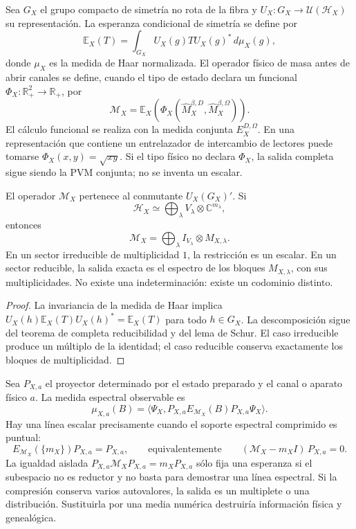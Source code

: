 Sea \(G_X\) el grupo compacto de simetría no rota de la fibra y
\(U_X:G_X\to\mathcal U(\mathcal H_X)\) su representación. La esperanza
condicional de simetría se define por
\[
 \mathbb E_X(T)
 =\int_{G_X}U_X(g)TU_X(g)^*\,d\mu_X(g),
\]
donde \(\mu_X\) es la medida de Haar normalizada. El operador físico de masa
antes de abrir canales se define, cuando el tipo de estado declara un
funcional \(\Phi_X:\mathbb R_+^2\to\mathbb R_+\), por
\[
 \mathcal M_X
 =\mathbb E_X\!\left(
   \Phi_X(\widehat M_X^{\beta,D},\widehat M_X^{\beta,\Omega})
  \right).
\]
El cálculo funcional se realiza con la medida conjunta
\(E_X^{D,\Omega}\). En una representación que contiene un entrelazador de
intercambio de lectores puede tomarse \(\Phi_X(x,y)=\sqrt{xy}\). Si el tipo
físico no declara \(\Phi_X\), la salida completa sigue siendo la PVM conjunta;
no se inventa un escalar.

\begin{theorem}
El operador \(\mathcal M_X\) pertenece al conmutante
\(U_X(G_X)'\). Si
\[
 \mathcal H_X\simeq
 \bigoplus_\lambda V_\lambda\otimes\mathbb C^{m_\lambda},
\]
entonces
\[
 \mathcal M_X=
 \bigoplus_\lambda I_{V_\lambda}\otimes M_{X,\lambda}.
\]
En un sector irreducible de multiplicidad \(1\), la restricción es un escalar.
En un sector reducible, la salida exacta es el espectro de los bloques
\(M_{X,\lambda}\), con sus multiplicidades. No existe una indeterminación:
existe un codominio distinto.
\end{theorem}

\begin{proof}
La invariancia de la medida de Haar implica
\(U_X(h)\mathbb E_X(T)U_X(h)^*=\mathbb E_X(T)\) para todo \(h\in G_X\).
La descomposición sigue del teorema de completa reducibilidad y del lema de
Schur. El caso irreducible produce un múltiplo de la identidad; el caso
reducible conserva exactamente los bloques de multiplicidad.
\end{proof}

Sea \(P_{X,a}\) el proyector determinado por el estado preparado y el canal o
aparato físico \(a\). La medida espectral observable es
\[
 \mu_{X,a}(B)=
 \langle\Psi_X,
 P_{X,a}E_{\mathcal M_X}(B)P_{X,a}\Psi_X\rangle.
\]
Hay una línea escalar precisamente cuando el soporte espectral comprimido es
puntual:
\[
 E_{\mathcal M_X}(\{m_X\})P_{X,a}=P_{X,a},
 \qquad\text{equivalentemente}\qquad
 (\mathcal M_X-m_X I)\,P_{X,a}=0.
\]
La igualdad aislada
\(P_{X,a}\mathcal M_X P_{X,a}=m_X P_{X,a}\) sólo fija una esperanza si el
subespacio no es reductor y no basta para demostrar una línea espectral.
Si la compresión conserva varios autovalores, la salida es un multiplete o una
distribución. Sustituirla por una media numérica destruiría información
física y genealógica.

